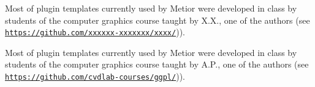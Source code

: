 \ifreview

Most of plugin templates currently used by Metior were developed in class by students of the computer  graphics course taught by X.X., one of the authors (see \href{https://github.com/xxxxxx-xxxxxxx/xxxx/xxxx/xxxxxx/xxxxxx.xx}{\texttt{https://github.com/xxxxxx-xxxxxxx/xxxx/}})). 

\else

Most of plugin templates currently used by Metior were developed in class by students of the computer  graphics course taught by A.P., one of the authors (see \href{https://github.com/cvdlab-courses/ggpl/blob/master/slides.md}{\texttt{https://github.com/cvdlab-courses/ggpl/}})).

\fi

